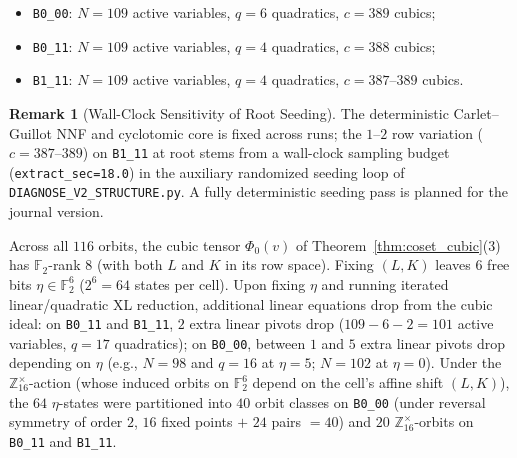 \documentclass[11pt,a4paper]{article}
\theoremstyle{definition}
\newtheorem{remark}[theorem]{Remark}
\newcommand{\F}{\mathbb{F}_2}
\newcommand{\Z}{\mathbb{Z}}
\begin{document}
\begin{itemize}
  \item \texttt{B0\_00}: $N = 109$ active variables, $q = 6$ quadratics, $c = 389$ cubics;
  \item \texttt{B0\_11}: $N = 109$ active variables, $q = 4$ quadratics, $c = 388$ cubics;
  \item \texttt{B1\_11}: $N = 109$ active variables, $q = 4$ quadratics, $c = 387$--$389$ cubics.
\end{itemize}
\begin{remark}[Wall-Clock Sensitivity of Root Seeding]
The deterministic Carlet--Guillot NNF and cyclotomic core is fixed across runs; the $1$--$2$ row variation ($c = 387$--$389$) on \texttt{B1\_11} at root stems from a wall-clock sampling budget (\texttt{extract\_sec=18.0}) in the auxiliary randomized seeding loop of \texttt{DIAGNOSE\_V2\_STRUCTURE.py}. A fully deterministic seeding pass is planned for the journal version.
\end{remark}

Across all $116$ orbits, the cubic tensor $\Phi_0(v)$ of Theorem~\ref{thm:coset_cubic}(3) has $\F$-rank $8$ (with both $L$ and $K$ in its row space). Fixing $(L, K)$ leaves $6$ free bits $\eta \in \F^6$ ($2^6 = 64$ states per cell). Upon fixing $\eta$ and running iterated linear/quadratic XL reduction, additional linear equations drop from the cubic ideal: on \texttt{B0\_11} and \texttt{B1\_11}, $2$ extra linear pivots drop ($109 - 6 - 2 = 101$ active variables, $q = 17$ quadratics); on \texttt{B0\_00}, between $1$ and $5$ extra linear pivots drop depending on $\eta$ (e.g., $N = 98$ and $q = 16$ at $\eta=5$; $N = 102$ at $\eta=0$). Under the $\Z_{16}^\times$-action (whose induced orbits on $\F^6$ depend on the cell's affine shift $(L,K)$), the $64$ $\eta$-states were partitioned into $40$ orbit classes on \texttt{B0\_00} (under reversal symmetry of order $2$, $16$ fixed points $+$ $24$ pairs $= 40$) and $20$ $\Z_{16}^\times$-orbits on \texttt{B0\_11} and \texttt{B1\_11}.
\end{document}

